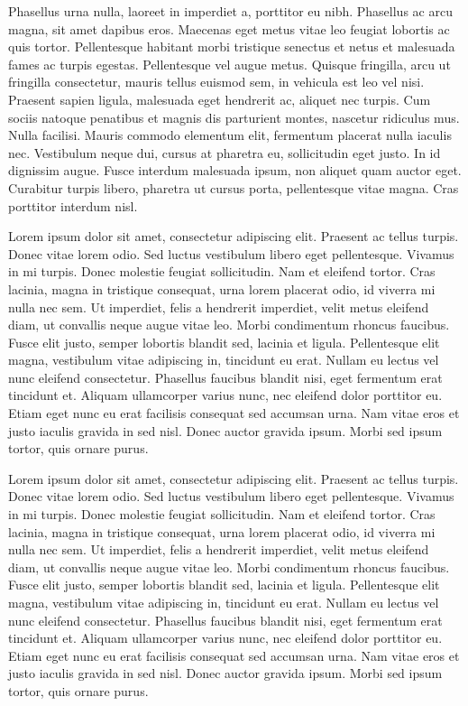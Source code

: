 \documentclass[qual, classic, a4paper]{ufbathesis}
\begin{document}
Phasellus urna nulla, laoreet in imperdiet a, porttitor eu nibh. Phasellus ac arcu magna, sit amet dapibus eros. Maecenas eget metus vitae leo feugiat lobortis ac quis tortor. Pellentesque habitant morbi tristique senectus et netus et malesuada fames ac turpis egestas. Pellentesque vel augue metus. Quisque fringilla, arcu ut fringilla consectetur, mauris tellus euismod sem, in vehicula est leo vel nisi. Praesent sapien ligula, malesuada eget hendrerit ac, aliquet nec turpis. Cum sociis natoque penatibus et magnis dis parturient montes, nascetur ridiculus mus. Nulla facilisi. Mauris commodo elementum elit, fermentum placerat nulla iaculis nec. Vestibulum neque dui, cursus at pharetra eu, sollicitudin eget justo. In id dignissim augue. Fusce interdum malesuada ipsum, non aliquet quam auctor eget. Curabitur turpis libero, pharetra ut cursus porta, pellentesque vitae magna. Cras porttitor interdum nisl.

Lorem ipsum dolor sit amet, consectetur adipiscing elit. Praesent ac tellus turpis. Donec vitae lorem odio. Sed luctus vestibulum libero eget pellentesque. Vivamus in mi turpis. Donec molestie feugiat sollicitudin. Nam et eleifend tortor. Cras lacinia, magna in tristique consequat, urna lorem placerat odio, id viverra mi nulla nec sem. Ut imperdiet, felis a hendrerit imperdiet, velit metus eleifend diam, ut convallis neque augue vitae leo. Morbi condimentum rhoncus faucibus. Fusce elit justo, semper lobortis blandit sed, lacinia et ligula. Pellentesque elit magna, vestibulum vitae adipiscing in, tincidunt eu erat. Nullam eu lectus vel nunc eleifend consectetur. Phasellus faucibus blandit nisi, eget fermentum erat tincidunt et. Aliquam ullamcorper varius nunc, nec eleifend dolor porttitor eu. Etiam eget nunc eu erat facilisis consequat sed accumsan urna. Nam vitae eros et justo iaculis gravida in sed nisl. Donec auctor gravida ipsum. Morbi sed ipsum tortor, quis ornare purus.



Lorem ipsum dolor sit amet, consectetur adipiscing elit. Praesent ac tellus turpis. Donec vitae lorem odio. Sed luctus vestibulum libero eget pellentesque. Vivamus in mi turpis. Donec molestie feugiat sollicitudin. Nam et eleifend tortor. Cras lacinia, magna in tristique consequat, urna lorem placerat odio, id viverra mi nulla nec sem. Ut imperdiet, felis a hendrerit imperdiet, velit metus eleifend diam, ut convallis neque augue vitae leo. Morbi condimentum rhoncus faucibus. Fusce elit justo, semper lobortis blandit sed, lacinia et ligula. Pellentesque elit magna, vestibulum vitae adipiscing in, tincidunt eu erat. Nullam eu lectus vel nunc eleifend consectetur. Phasellus faucibus blandit nisi, eget fermentum erat tincidunt et. Aliquam ullamcorper varius nunc, nec eleifend dolor porttitor eu. Etiam eget nunc eu erat facilisis consequat sed accumsan urna. Nam vitae eros et justo iaculis gravida in sed nisl. Donec auctor gravida ipsum. Morbi sed ipsum tortor, quis ornare purus.
\end{document}
